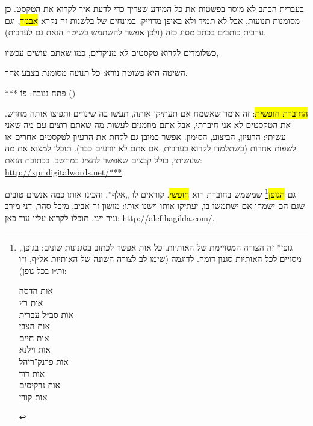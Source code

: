 בעברית הכתב לא מוסר בפשטות את כל המידע שצריך כדי לדעת איך לקרוא את הטקסט. כן מסומנות תנועות, אבל לא תמיד ולא באופן מדוייק. במונחים של בלשנות זה נקרא \hl{אבג׳ד}, וגם ערבית כותבים בכתב מסוג כזה (ולכן אפשר להשתמש בשיטה הזאת גם לערבית).

כשלומדים לקרוא טקסטים לא מנוקדים, כמו שאתם עושים עכשיו, 

השיטה היא פשוטה נורא: כל תנועה מסומנת בצבע אחר.

*** פתח גנובה: \u{פו}\gnuva {} ()

\hl{החוברת חופשית}: זה אומר שאשמח אם תעתיקו אותה, תעשו בה שינויים ותפיצו אותה מחדש. את הטקסטים לא אני חיברתי, אבל אתם מוזמנים לעשות מה שאתם רוצים עם מה שאני עשיתי: הרעיון, הביצוע, הסימון. אפשר כמובן גם לקחת את הרעיון לטקסטים אחרים או לשפות אחרות (כשתלמדו לקרוא בערבית, אם אתם לא יודעים כבר). תוכלו למצוא את מה שעשיתי, כולל קבצים שאפשר להציג במחשב, בכתובת הזאת: \url{http://xpr.digitalwords.net/***}

גם \hl{הגופן}\footnote{„גופן” זה הצורה המסויימת של האותיות. כל אות אפשר לכתוב בסגנונות שונים; בגופן מסויים לכל האותיות סגנון דומה. לדוגמה (שימו לב לצורה השונה של האותיות אל״ף, ו״ו ות״ו בכל גופן):
	\begin{multicols}{3}
		\noindent
		{אות הדסה}\\
		{אות רץ}\\
		{אות סב״ל עברית}\\
		{אות הצבי}\\
		{אות חיים}\\
		{אות וילנא}\\
		{אות פרנק־ריהל}\\
		{אות דוד}\\
		{אות נרקיסים}\\
		{אות קורן}
	\end{multicols}
	} שמשמש בחוברת הוא \hl{חופשי}. קוראים לו „אלף”, והכינו אותו כמה אנשים טובים שגם הם ישמחו אם ישתמשו בו, יעתיקו אותו וישנו אותו: מושון זר־אביב, מיכל סהר, דני מירב וניר ייני. תוכלו לקרוא עליו עוד כאן: \url{http://alef.hagilda.com/}.
